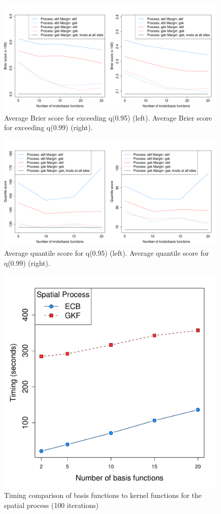 \documentclass[11pt]{article}
\begin{document}
\begin{figure}  %
  \centering
  \includegraphics[width=\linewidth]{plots/bs-mean-fire}
  \caption{Average Brier score for exceeding q(0.95) (left). Average Brier score for exceeding q(0.99) (right).}
  \label{fig:avgqscore}
\end{figure}

\begin{figure}  %
	\centering
	\includegraphics[width=\linewidth]{plots/qs-mean-fire}
	\caption{Average quantile score for q(0.95) (left). Average quantile score for q(0.99) (right).}
  \label{fig:avgqscore}
\end{figure}

\begin{figure}  %
	\centering
	\includegraphics[width=0.47\linewidth]{plots/timing}
	\caption{Timing comparison of basis functions to kernel functions for the spatial process (100 iterations)}
  \label{fig:timingcompare}
\end{figure}
\end{document}
